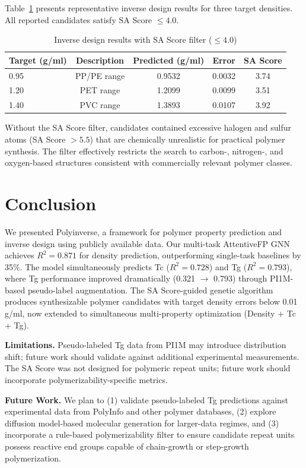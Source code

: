 \documentclass{article}
\begin{document}
Table~\ref{tab:inverse} presents representative inverse design results for
three target densities. All reported candidates satisfy SA Score $\leq 4.0$.

\begin{table}[h]
\centering
\caption{Inverse design results with SA Score filter ($\leq 4.0$)}
\label{tab:inverse}
\begin{tabular}{lcccc}
\toprule
Target (g/ml) & Description & Predicted (g/ml) & Error & SA Score \\
\midrule
0.95 & PP/PE range & 0.9532 & 0.0032 & 3.74 \\
1.20 & PET range   & 1.2099 & 0.0099 & 3.51 \\
1.40 & PVC range   & 1.3893 & 0.0107 & 3.92 \\
\bottomrule
\end{tabular}
\end{table}

Without the SA Score filter, candidates contained excessive halogen and
sulfur atoms (SA Score $> 5.5$) that are chemically unrealistic for
practical polymer synthesis. The filter effectively restricts the search
to carbon-, nitrogen-, and oxygen-based structures consistent with
commercially relevant polymer classes.

\section{Conclusion}

We presented Polyinverse, a framework for polymer property prediction
and inverse design using publicly available data.
Our multi-task AttentiveFP GNN achieves $R^2 = 0.871$ for density prediction,
outperforming single-task baselines by 35\%.
The model simultaneously predicts Tc ($R^2=0.728$) and Tg ($R^2=0.793$),
where Tg performance improved dramatically (0.321 $\rightarrow$ 0.793)
through PI1M-based pseudo-label augmentation.
The SA Score-guided genetic algorithm produces synthesizable polymer
candidates with target density errors below 0.01 g/ml, now extended
to simultaneous multi-property optimization (Density + Tc + Tg).

\noindent\textbf{Limitations.}
Pseudo-labeled Tg data from PI1M may introduce distribution shift;
future work should validate against additional experimental measurements.
The SA Score was not designed for polymeric repeat units; future work
should incorporate polymerizability-specific metrics.

\noindent\textbf{Future Work.}
We plan to (1) validate pseudo-labeled Tg predictions against experimental
data from PolyInfo and other polymer databases,
(2) explore diffusion model-based molecular generation for larger-data regimes,
and (3) incorporate a rule-based polymerizability filter to ensure
candidate repeat units possess reactive end groups capable of
chain-growth or step-growth polymerization.
\end{document}
